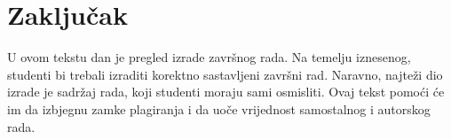 \section{Zaključak}
U ovom tekstu dan je pregled izrade završnog rada. Na temelju iznesenog, studenti bi trebali izraditi korektno sastavljeni završni rad. 
Naravno, najteži dio izrade je 
sadržaj rada, koji studenti moraju sami osmisliti. 
Ovaj tekst pomoći će im da izbjegnu zamke plagiranja i da uoče vrijednost samostalnog i autorskog rada.